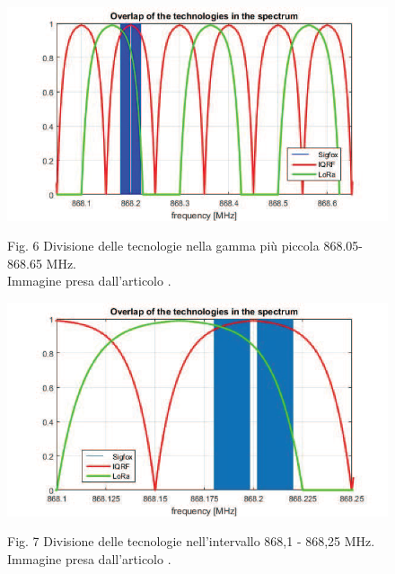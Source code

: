 \documentclass[a4paper]{report} %
\begin{document}
\begin{figure}
\centering
\includegraphics[scale=.5]{Immagini/DivisioneBande2.png}

Fig. 6 Divisione delle tecnologie nella gamma più piccola 868.05-868.65 MHz.\\ %
Immagine presa dall'articolo \cite{art:rif.46}.
\end{figure}

\begin{figure}
\centering
\includegraphics[scale=.5]{Immagini/DivB2.png}

Fig. 7 Divisione delle tecnologie nell'intervallo 868,1 - 868,25 MHz.\\ %
Immagine presa dall'articolo \cite{art:rif.46}.
\end{figure}
\end{document}
